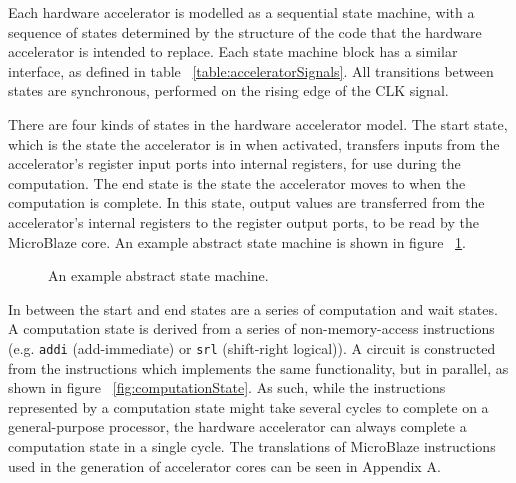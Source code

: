 \documentclass{UoYCSproject}
\begin{document}
Each hardware accelerator is modelled as a sequential state machine, with a sequence of states determined by the structure
of the code that the hardware accelerator is intended to replace. Each state machine block has a similar interface, as defined in
table ~\ref{table:acceleratorSignals}. All transitions between states are synchronous, performed on the rising edge of the CLK
signal.

There are four kinds of states in the hardware accelerator model. The start state, which is the state the accelerator is in
when activated, transfers inputs from the accelerator's register input ports into internal registers, for use during the
computation. The end state is the state the accelerator moves to when the computation is complete. In this state, output values
are transferred from the accelerator's internal registers to the register output ports, to be read by the MicroBlaze core.
An example abstract state machine is shown in figure ~\ref{fig:abstractStateMachine}.

\begin{figure}[H]
\centering
{}
\caption{An example abstract state machine.}
\label{fig:abstractStateMachine}
\end{figure}

In between the start and end states are a series of computation and wait states. A computation state is derived from a series of
non-memory-access instructions (e.g. \texttt{addi} (add-immediate) or \texttt{srl} (shift-right logical)).
A circuit is constructed from the instructions which implements the same functionality, but in parallel,
as shown in figure ~\ref{fig:computationState}. As such, while the instructions represented by a computation state might take
several cycles to complete on a general-purpose processor, the hardware accelerator can always complete a computation state in a
single cycle. The translations of MicroBlaze instructions used in the generation of accelerator cores can be seen in Appendix A.
\end{document}
